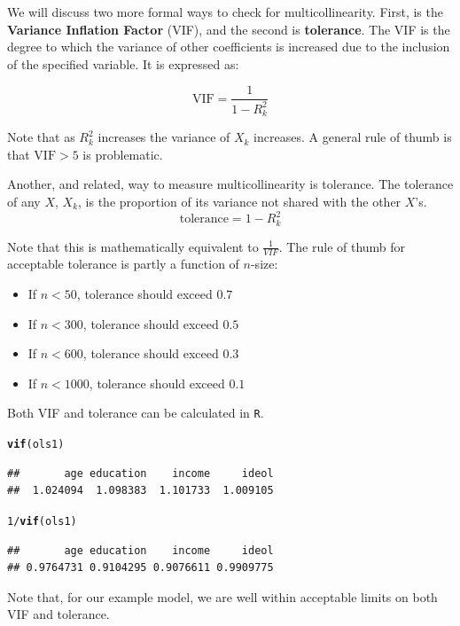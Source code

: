 \documentclass[11pt,openany]{book}\usepackage[]{graphicx}\usepackage[]{color}
\makeatletter
\newcommand{\hlnum}[1]{\textcolor[rgb]{0.686,0.059,0.569}{#1}}%
\newcommand{\hlopt}[1]{\textcolor[rgb]{0,0,0}{#1}}%
\newcommand{\hlstd}[1]{\textcolor[rgb]{0.345,0.345,0.345}{#1}}%
\newcommand{\hlkwd}[1]{\textcolor[rgb]{0.737,0.353,0.396}{\textbf{#1}}}%
\newenvironment{kframe}{%
 \def\at@end@of@kframe{}%
 \ifinner\ifhmode%
  \def\at@end@of@kframe{\end{minipage}}%
  \begin{minipage}{\columnwidth}%
 \fi\fi%
 \def\FrameCommand##1{\hskip\@totalleftmargin \hskip-\fboxsep
 \colorbox{shadecolor}{##1}\hskip-\fboxsep
     \hskip-\linewidth \hskip-\@totalleftmargin \hskip\columnwidth}%
 \MakeFramed {\advance\hsize-\width
   \@totalleftmargin\z@ \linewidth\hsize
   \@setminipage}}%
 {\par\unskip\endMakeFramed%
 \at@end@of@kframe}
\newenvironment{knitrout}{}{} %
\renewenvironment{knitrout}{\begin{singlespace}}{\end{singlespace}}
\makeatother
\begin{document}
We will discuss two more formal ways to check for multicollinearity. First, is the  \textbf{Variance Inflation Factor} (VIF), and the second is \textbf{tolerance}. The VIF is the  degree to which the variance of other coefficients is increased due to the inclusion of the specified variable. It is expressed as: 

\begin{equation}
  \label{eq:vif}
  \text{VIF} = \frac{1}{1-R^2_k}
\end{equation}

\noindent Note that as $R^2_k$ increases the variance of $X_k$ increases. A general rule of thumb is that $\text{VIF} > 5$ is problematic. 

Another, and related, way to measure multicollinearity is tolerance. The tolerance of any $X$, $X_k$, is the proportion of its variance not shared with the other $X$'s. 
\begin{equation}
  \label{eq:tolerance}
  \text{tolerance} = 1-R^2_k 
\end{equation}

\noindent Note that this is mathematically equivalent to $\frac{1}{VIF}$. The rule of thumb for acceptable tolerance is partly a function of $n$-size:

 
\begin{itemize}
\item If $n < 50$, tolerance should exceed $0.7$
\item If $n < 300$, tolerance should exceed $0.5$
\item If $n < 600$, tolerance should exceed $0.3$
\item If $n < 1000$, tolerance should exceed $0.1$
\end{itemize}



Both VIF and tolerance can be calculated in \texttt{R}. 
\begin{knitrout}
\color{fgcolor}\begin{kframe}
\begin{alltt}
\hlkwd{vif}\hlstd{(ols1)}
\end{alltt}
\begin{verbatim}
##       age education    income     ideol 
##  1.024094  1.098383  1.101733  1.009105
\end{verbatim}
\begin{alltt}
\hlnum{1}\hlopt{/}\hlkwd{vif}\hlstd{(ols1)}
\end{alltt}
\begin{verbatim}
##       age education    income     ideol 
## 0.9764731 0.9104295 0.9076611 0.9909775
\end{verbatim}
\end{kframe}
\end{knitrout}
\noindent Note that, for our example model, we are well within acceptable limits on both VIF and tolerance. 
\end{document}
